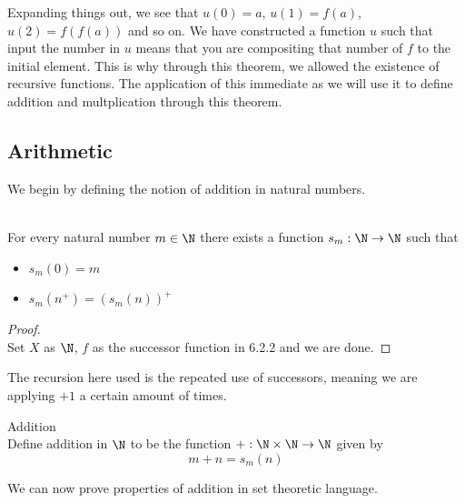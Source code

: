 \documentclass[a4paper]{article}
\begin{document}
Expanding things out, we see that $u(0)=a$, $u(1)=f(a)$, $u(2)=f(f(a))$ and so on. We have constructed a function $u$ such that input the number in $u$ means that you are compositing that number of $f$ to the initial element. This is why through this theorem, we allowed the existence of recursive functions. The application of this immediate as we will use it to define addition and multplication through this theorem. 

\subsection{Arithmetic}
We begin by defining the notion of addition in natural numbers. 
\begin{prp}{}{}\\
For every natural number $m\in\N$ there exists a function $s_m:\N\to\N$ such that
\begin{itemize}
\item $s_m(0)=m$
\item $s_m(n^+)=(s_m(n))^+$
\end{itemize}
\begin{proof}\\
Set $X$ as $\N$, $f$ as the successor function in 6.2.2 and we are done. 
\end{proof}
\end{prp}

The recursion here used is the repeated use of successors, meaning we are applying $+1$ a certain amount of times. 

\begin{defn}{Addition}{}\\
Define addition in $\N$ to be the function $+:\N\times\N\to\N$ given by $$m+n=s_m(n)$$
\end{defn}

We can now prove properties of addition in set theoretic language. 
\end{document}

